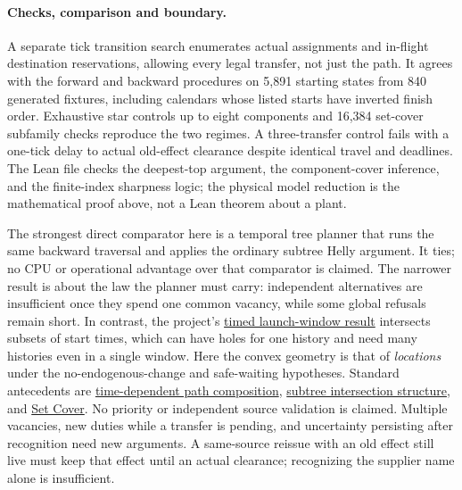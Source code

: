 \documentclass[11pt]{article}
\begin{document}
\paragraph{Checks, comparison and boundary.}
A separate tick transition search enumerates actual assignments and in-flight destination reservations, allowing every legal transfer, not just the path. It agrees with the forward and backward procedures on 5,891 starting states from 840 generated fixtures, including calendars whose listed starts have inverted finish order. Exhaustive star controls up to eight components and 16,384 set-cover subfamily checks reproduce the two regimes. A three-transfer control fails with a one-tick delay to actual old-effect clearance despite identical travel and deadlines. The Lean file checks the deepest-top argument, the component-cover inference, and the finite-index sharpness logic; the physical model reduction is the mathematical proof above, not a Lean theorem about a plant.

The strongest direct comparator here is a temporal tree planner that runs the same backward traversal and applies the ordinary subtree Helly argument. It ties; no CPU or operational advantage over that comparator is claimed. The narrower result is about the law the planner must carry: independent alternatives are insufficient once they spend one common vacancy, while some global refusals remain short. In contrast, the project's \href{https://github.com/eternal-november/eos-research-programmes/pull/381}{timed launch-window result} intersects subsets of start times, which can have holes for one history and need many histories even in a single window. Here the convex geometry is that of \emph{locations} under the no-endogenous-change and safe-waiting hypotheses. Standard antecedents are \href{https://people.csail.mit.edu/bdean/tdsp}{time-dependent path composition}, \href{https://www.math.u-szeged.hu/~hajnal/courses/PhD_Specialis/Gavril.pdf}{subtree intersection structure}, and \href{https://www.cs.umd.edu/~gasarch/BLOGPAPERS/Karp.pdf}{Set Cover}. No priority or independent source validation is claimed. Multiple vacancies, new duties while a transfer is pending, and uncertainty persisting after recognition need new arguments. A same-source reissue with an old effect still live must keep that effect until an actual clearance; recognizing the supplier name alone is insufficient.
\end{document}
